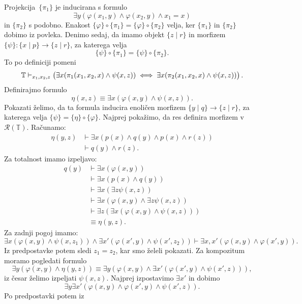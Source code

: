 \documentclass[../kategoricna_logika.tex]{subfiles}
\begin{document}
\begin{dokaz}
\begin{enumerate}[label=(\roman*)]
    Projekcija~$\{\pi_1\}$ je inducirana s formulo
    \[\exists y(\varphi(x_1,y) \land \varphi(x_2,y) \land x_1 = x )\]
    in $\{\pi_2\}$ s podobno.  Enakost
    $\{\varphi\} \circ \{\pi_1\} = \{ \varphi\} \circ \{\pi_2\}$
    velja, ker $\{\pi_1\}$ in $\{\pi_2\}$ dobimo iz povleka. Denimo
    sedaj, da imamo objekt $\{ z \mid r\}$ in morfizem
    $\{\psi\} : \{ x \mid p\} \to \{ z \mid r\}$, za katerega velja
    \[\{\psi\} \circ \{\pi_1\} = \{\psi\} \circ \{\pi_2\}.\] To po
    definiciji pomeni
    \[ \mathbb{T} \vdash_{x_1,x_2,z} \left(\exists x (\pi_1(x_1,x_2,x) \land
        \psi(x,z)) \iff \exists x (\pi_2(x_1,x_2,x) \land
        \psi(x,z))\right).
    \]
    Definirajmo formulo
    \[ \eta(x,z) \equiv \exists x(\varphi(x,y) \land \psi(x,z)).\]
    Pokazati želimo, da ta formula inducira enoličen morfizem
    ${\{y \mid q\} \to \{z \mid r\}}$, za katerega velja
    $\{\psi\} = \{ \eta\} \circ \{\varphi\}$.  Najprej pokažimo, da
    res definira morfizem v $\mathcal{R}(\mathbb{T})$. Računamo:
    \begin{align*}
      \eta(y,z) &\vdash \exists x(p(x) \land q(y) \land p(x) \land r(z)) \\
                &\vdash q(y) \land r(z).
    \end{align*}
    Za totalnost imamo izpeljavo:
    \begin{align*}
      q(y) &\vdash\exists x(\varphi(x,y)) \\
           &\vdash \exists x(p(x) \land q(y)) \\
           &\vdash \exists x (\exists z \psi(x,z)) \\
           &\vdash \exists x(\varphi(x,y) \land \exists z \psi(x,z)) \\
           &\vdash \exists z ( \exists x(\varphi(x,y) \land \psi(x,z))) \\
           &\equiv \eta(y,z).
    \end{align*}
    Za zadnji pogoj imamo:
    \[ \exists x(\varphi(x,y) \land \psi(x,z_1)) \land \exists x'
      (\varphi(x',y) \land \psi(x',z_2)) \vdash \exists
      x,x'(\varphi(x,y) \land \varphi(x',y)).\] Iz predpostavke potem
    sledi $z_1 = z_2$, kar smo želeli pokazati.  Za kompozitum moramo
    pogledati formulo
    \[ \exists y(\varphi(x,y) \land \eta(y,z)) \equiv \exists
      y(\varphi(x,y) \land \exists x'(\varphi(x',y) \land \psi(x',z))
      ), \] iz česar želimo izpeljati $\psi(x,z)$. Najprej izpostavimo
    $\exists x'$ in dobimo
    \[\exists y \exists x'( \varphi(x,y) \land \varphi(x',y) \land
      \psi(x',z)). \] Po predpostavki potem iz

\end{enumerate}
\end{dokaz}
\end{document}
